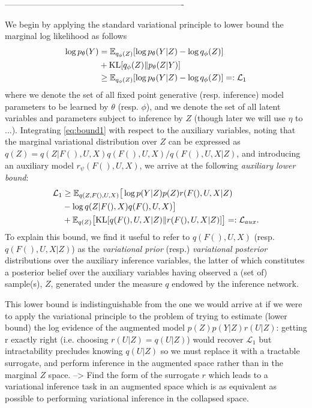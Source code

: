 \documentclass{article}
\begin{document}
----------------------------------------------------------------

We begin by applying the standard variational principle to lower bound the marginal log likelihood as follows
%
\begin{align}
  \log p_\theta(Y) &= \mathbb{E}_{q_\phi(Z)}[\log p_\theta(Y|Z) - \log q_\phi(Z)]\notag\\
  &+ \text{KL}[q_\phi(Z)\Vert p_\theta(Z|Y)]\label{eq:var_principle}\\
  &\geq \mathbb{E}_{q_\phi(Z)}[\log p_\theta(Y|Z) - \log q_\phi(Z)] =: \mathcal{L}_1\label{eq:bound1}
\end{align}
 where we denote the set of all fixed point generative (resp. inference) model parameters to be learned by $\theta$ (resp. $\phi$), and we denote the set of all latent variables and parameters subject to inference by $Z$ (though later we will use $\eta$ to ...).
 Integrating \ref{eq:bound1} with respect to the auxiliary variables, noting that the marginal variational distribution over $Z$ can be expressed as $q(Z) = q(Z|F(),U,X)q(F(),U,X)/q(F(),U,X|Z)$, and introducing an auxiliary model $r_\psi(F(),U,X)$, we arrive at the following \emph{auxiliary lower bound}:
 \begin{align}
  \mathcal{L}_1 &\geq \mathbb{E}_{q(Z,F(),U,X)}\big[ \log p(Y|Z)p(Z)r(F(),U,X|Z)\notag\\
   &- \log q(Z|F(),X)q(F(),U,X) \big]\label{eq:lowerlower}\\
    &+ \mathbb{E}_{q(Z)}\big[ \text{KL}[q(F(),U,X|Z)\Vert r(F(),U,X|Z)] \big] =: \mathcal{L}_{aux}.\label{eq:L_aux}
 \end{align}
%
To explain this bound, we find it useful to refer to $q(F(),U,X)$ (resp. $q(F(),U,X|Z)$) as the \emph{variational prior} (resp.) \emph{variational posterior} distributions over the auxiliary inference variables, the latter of which constitutes a posterior belief over the auxiliary variables having observed a (set of) sample(s), $Z$, generated under the measure $q$ endowed by the inference network.


This lower bound is indistinguishable from the one we would arrive at if we were to apply the variational principle to the problem of trying to estimate (lower bound) the log evidence of the augmented model $p(Z)p(Y|Z)r(U|Z)$: getting r exactly right (i.e. choosing $r(U|Z)=q(U|Z)$) would recover $\mathcal{L}_1$ but intractability precludes knowing $q(U|Z)$ so we must replace it with a tractable surrogate, and perform inference in the augmented space rather than in the marginal $Z$ space. --> Find the form of the surrogate $r$ which leads to a variational inference task in an augmented space which is as equivalent as possible to performing variational inference in the collapsed space.
\end{document}
